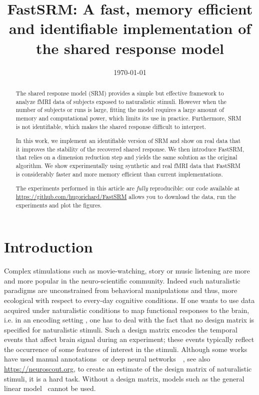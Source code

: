 \documentclass{article}
\title{FastSRM: A fast, memory efficient and identifiable implementation of the
  shared response model}
\date{\today} %
\newcommand{\bt}[1]{\todo[color=orange, inline=True]{BT: #1}}
\begin{document}
\maketitle

\begin{abstract}
  The shared response model (SRM) provides a simple but effective framework to analyze
  fMRI data of subjects exposed to naturalistic stimuli.
  However when the number
  of subjects or runs is large,
  fitting the model requires a large amount of memory
and computational power, which limits its use in practice.
%
Furthermore, SRM is
not identifiable, which makes the shared response difficult to interpret.


In this work, we implement an identifiable version of SRM and show on real data
that it improves the stability of the recovered shared response.
%
We then introduce FastSRM, that relies on a dimension reduction step and yields the same solution as the original algorithm.
%
We show experimentally using synthetic and real fMRI data
that FastSRM is considerably faster and more memory efficient
than current implementations.


The experiments performed in this article are \emph{fully} reproducible: our
code available at \url{https://github.com/hugorichard/FastSRM} allows you to download the
data, run the experiments and plot the figures.
%

\end{abstract}

\section{Introduction}
%
Complex stimulations such as movie-watching, story or music listening are more
and more popular in the neuro-scientific community. Indeed such naturalistic
paradigms are unconstrained from behavioral manipulations and thus, more
ecological with respect to every-day cognitive conditions.
%
If one wants to use data acquired under naturalistic conditions to map
functional responses to the brain, i.e. in an encoding setting
\cite{naselaris2011}, one has to deal with the fact that no design matrix is
specified for naturalistic stimuli.
%
Such a design matrix encodes the temporal events that affect brain
signal during an experiment; these events typically reflect the occurrence
of some features of interest in the stimuli.
%
Although some works have used manual
annotations~\cite{huth2012continuous} or deep neural
networks~\cite{gucclu2017increasingly}~\cite{richard2018optimizing},
see also \url{https://neuroscout.org}, to create an estimate of the
design matrix of naturalistic stimuli, it is a hard task.
%
Without a design matrix, models such as the general linear
model~\cite{poline2012general} cannot be used.
\end{document}
